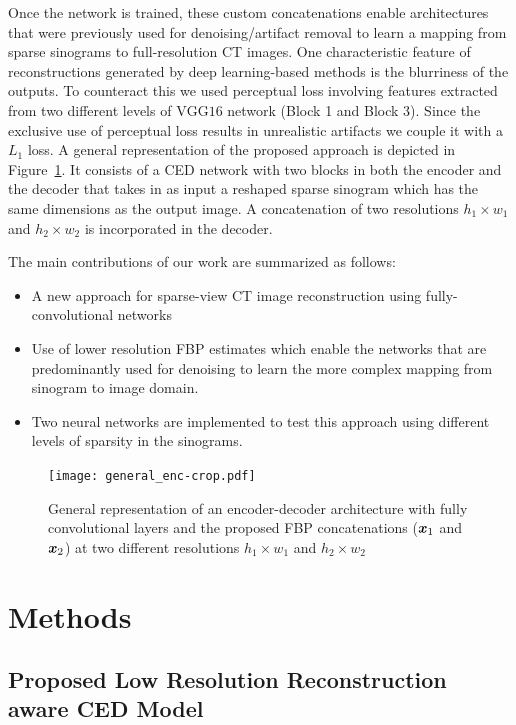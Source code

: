 Once the network is trained, these custom concatenations enable architectures that were previously used for denoising/artifact removal to learn a mapping from sparse sinograms to full-resolution \ac{CT} images. One characteristic feature of reconstructions generated by deep learning-based methods is the blurriness of the outputs. To counteract this we used perceptual loss involving features extracted from two different levels of $\mathrm{VGG16}$ network (Block 1 and Block 3). Since the exclusive use of perceptual loss results in unrealistic artifacts we couple it with a $L_1$ loss. A general representation of the proposed approach is depicted in Figure~\ref{fig:ge}. It consists of a \ac{CED} network with two blocks in both the encoder and the decoder that takes in as input a reshaped sparse sinogram which has the same dimensions as the output image. A concatenation of two resolutions $h_1 \times w_1$ and $h_2 \times w_2$ is incorporated in the decoder. 

The main contributions of our work are summarized as follows:
\begin{itemize}
	\item A new approach for sparse-view \ac{CT} image reconstruction using fully-convolutional networks
	\item Use of lower resolution \ac{FBP} estimates which enable the networks that are predominantly used for denoising to learn the more complex mapping from sinogram to image domain. 
	\item Two neural networks are implemented to test this approach using different levels of sparsity in the sinograms. 
\end{itemize}

\begin{figure}[!htbp]
	\centering
	\texttt{[image: general\_enc-crop.pdf]}
	\caption{General representation of an encoder-decoder architecture with fully convolutional layers and the proposed \ac{FBP} concatenations ($\bm{x}_1$ and $\bm{x}_2$) at two different resolutions $h_1 \times w_1$ and $h_2 \times w_2$}
	\label{fig:ge}
\end{figure}


\section{Methods}

\subsection{Proposed Low Resolution Reconstruction aware \ac{CED} Model}

